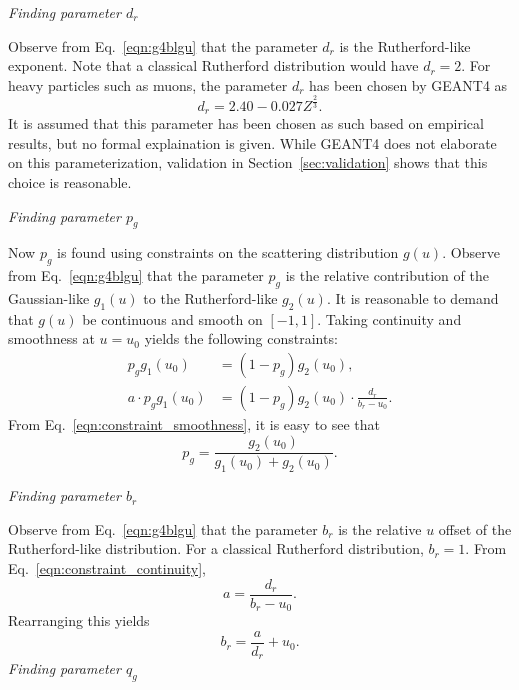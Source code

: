 \noindent \textit{\large{Finding parameter $d_r$}}


Observe from Eq.~\eqref{eqn:g4blgu} that the parameter $d_r$ is the Rutherford-like exponent. Note that a classical Rutherford distribution would have $d_r=2$. For heavy particles such as muons, the parameter $d_r$ has been chosen by GEANT4 \cite{geant4} as
\begin{equation}
d_r=2.40-0.027Z^{\frac{2}{3}}.
\label{eqn:geantd}
\end{equation}
It is assumed that this parameter has been chosen as such based on empirical results, but no formal explaination is given. While GEANT4 \cite{geant4} does not elaborate on this parameterization, validation in Section~\ref{sec:validation} shows that this choice is reasonable.

\noindent \textit{\large{Finding parameter $p_g$}}

Now $p_g$ is found using constraints on the scattering distribution $g(u)$. Observe from Eq.~\eqref{eqn:g4blgu} that the parameter $p_g$ is the relative contribution of the Gaussian-like $g_1(u)$ to the Rutherford-like $g_2(u)$. It is reasonable to demand that $g(u)$ be continuous and smooth on $[-1,1]$. Taking continuity and smoothness at $u=u_0$ yields the following constraints:
%
\begin{align}
p_g g_1(u_0)&=(1-p_g)g_2(u_0), \label{eqn:constraint_smoothness}\\
a\cdot p_g g_1(u_0)&=(1-p_g)g_2(u_0)\cdot\frac{d_r}{b_r-u_0}. \label{eqn:constraint_continuity}
\end{align}
%
From Eq.~\eqref{eqn:constraint_smoothness}, it is easy to see that
%
\begin{equation}
p_g=\frac{g_2(u_0)}{g_1(u_0)+g_2(u_0)}.
\label{eqn:geantp}
\end{equation}
%

\noindent \textit{\large{Finding parameter $b_r$}}

Observe from Eq.~\eqref{eqn:g4blgu} that the parameter $b_r$ is the relative $u$ offset of the Rutherford-like distribution. For a classical Rutherford distribution, $b_r=1$. From Eq.~\eqref{eqn:constraint_continuity},
%
\begin{equation}\nonumber
a=\frac{d_r}{b_r-u_0}.
\end{equation}
%
Rearranging this yields
%
\begin{equation}
b_r=\frac{a}{d_r}+u_0.
\label{eqn:geantb}
\end{equation}
%
\noindent \textit{\large{Finding parameter $q_g$}}

